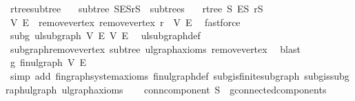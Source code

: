 \begin{isabellebody}
\isanewline
{}\isamarkupfalse%
\ rtree{\isacharunderscore}{\kern0pt}subtree{\isacharcolon}{\kern0pt}\isanewline
\ \ \ subtree{\isacharcolon}{\kern0pt}\ {\isachardoublequoteopen}{\isacharparenleft}{\kern0pt}S{\isacharcomma}{\kern0pt}E\isactrlsub S{\isacharcomma}{\kern0pt}r\isactrlsub S{\isacharparenright}{\kern0pt}\ {\isasymin}\ subtrees{\isachardoublequoteclose}\isanewline
\ \ \ {\isachardoublequoteopen}rtree\ S\ E\isactrlsub S\ r\isactrlsub S{\isachardoublequoteclose}\isanewline
%
\isadelimproof
%
\endisadelimproof
%
\isatagproof
{}\isamarkupfalse%
{\isacharminus}{\kern0pt}\isanewline
\ \ \isamarkupfalse%
\ V{\isacharprime}{\kern0pt}\ E{\isacharprime}{\kern0pt}\ \ remove{\isacharunderscore}{\kern0pt}vertex{\isacharcolon}{\kern0pt}\ {\isachardoublequoteopen}remove{\isacharunderscore}{\kern0pt}vertex\ r\ {\isacharequal}{\kern0pt}\ {\isacharparenleft}{\kern0pt}V{\isacharprime}{\kern0pt}{\isacharcomma}{\kern0pt}\ E{\isacharprime}{\kern0pt}{\isacharparenright}{\kern0pt}{\isachardoublequoteclose}\ \isamarkupfalse%
\ fastforce\isanewline
\ \ \isamarkupfalse%
\ subg{\isacharcolon}{\kern0pt}\ ulsubgraph\ V{\isacharprime}{\kern0pt}\ E{\isacharprime}{\kern0pt}\ V\ E\ \isamarkupfalse%
\ ulsubgraph{\isacharunderscore}{\kern0pt}def\ \isamarkupfalse%
\ subgraph{\isacharunderscore}{\kern0pt}remove{\isacharunderscore}{\kern0pt}vertex\ subtree\ ulgraph{\isacharunderscore}{\kern0pt}axioms\ remove{\isacharunderscore}{\kern0pt}vertex\ \isamarkupfalse%
\ blast\isanewline
\ \ \isamarkupfalse%
\ g{\isacharprime}{\kern0pt}{\isacharcolon}{\kern0pt}\ fin{\isacharunderscore}{\kern0pt}ulgraph\ V{\isacharprime}{\kern0pt}\ E{\isacharprime}{\kern0pt}\isanewline
\ \ \ \ \isamarkupfalse%
\ {\isacharparenleft}{\kern0pt}simp\ add{\isacharcolon}{\kern0pt}\ fin{\isacharunderscore}{\kern0pt}graph{\isacharunderscore}{\kern0pt}system{\isacharunderscore}{\kern0pt}axioms\ fin{\isacharunderscore}{\kern0pt}ulgraph{\isacharunderscore}{\kern0pt}def\ subg{\isachardot}{\kern0pt}is{\isacharunderscore}{\kern0pt}finite{\isacharunderscore}{\kern0pt}subgraph\ subg{\isachardot}{\kern0pt}is{\isacharunderscore}{\kern0pt}subgraph{\isacharunderscore}{\kern0pt}ulgraph\ ulgraph{\isacharunderscore}{\kern0pt}axioms{\isacharparenright}{\kern0pt}\isanewline
\ \ \isamarkupfalse%
\ conn{\isacharunderscore}{\kern0pt}component{\isacharcolon}{\kern0pt}\ {\isachardoublequoteopen}S\ {\isasymin}\ g{\isacharprime}{\kern0pt}{\isachardot}{\kern0pt}connected{\isacharunderscore}{\kern0pt}components{\isachardoublequoteclose}\ \isamarkupfalse%

\end{isabellebody}
